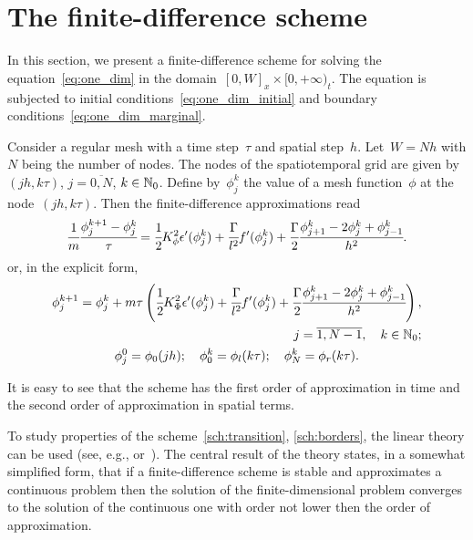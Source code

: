 
\section{The finite-difference scheme}
\label{sec:differential_scheme}

In this section, we present a finite-difference scheme for solving
the equation~\eqref{eq:one_dim} in the domain~$[0, W]_x \times [0,
+\infty)_t$. The equation is
subjected to initial conditions~\eqref{eq:one_dim_initial} and boundary conditions~\eqref{eq:one_dim_marginal}.

Consider a regular mesh with a time step~$\tau$ and
spatial step~$h$. Let~$W = Nh$ with $N$ being the number of
nodes. The nodes of the spatiotemporal grid are given by~$(jh, k \tau)$,
$j = \overline{0, N}$, $k \in {\mathbb{N}}_0$. Define by~$\phi_j^k$
the value of a mesh function~$\phi$ at the node~$(jh, k \tau)$.
Then the finite-difference approximations read
\begin{equation}
  \cfrac{1}{m} \cfrac{{\phi}_j^{k + 1} - {\phi}_j^k}{\tau} = \cfrac{1}{2} K_\phi^2 \epsilon'(\phi_j^k) + \cfrac{\Gamma}{l^2} f'(\phi_j^k) + \cfrac{\Gamma}{2} \cfrac{{\phi}_{j + 1}^k - 2 {\phi}_j^k + {\phi}_{j - 1}^k}{h^2} {\text{.}}
  \label{eq:subtractive}
\end{equation}
or, in the explicit form,
\begin{gather}
  \begin{aligned}
    \phi_j^{k + 1} = \phi_j^k + m \tau \left( \cfrac{1}{2} K_\Phi^2 \epsilon'(\phi_j^k) + \cfrac{\Gamma}{l^2} f'(\phi_j^k) + \cfrac{\Gamma}{2} \cfrac{{\phi}_{j + 1}^k - 2 {\phi}_j^k + {\phi}_{j - 1}^k}{h^2} \right), \\ j = \overline{1, N - 1}, \quad k \in {\mathbb{N}}_0 {\text{;}}
  \end{aligned}
  \label{sch:transition} \\
  \phi_j^0 = \phi_0(jh); \quad \phi_0^k = \phi_l(k \tau); \quad \phi_N^k = \phi_r(k \tau) {\text{.}}
  \label{sch:borders}
\end{gather}

It is easy to see that the scheme has the first order of approximation in
time and the second order of approximation in spatial terms.

To study properties of the scheme~\eqref{sch:transition}, \eqref{sch:borders},
the linear theory can be used (see, e.g.,
\cite[Chapter~10]{bahvalov_computational_methods}
or~\cite[Chapter~IX]{kalitkin_computational_methods}).
The central result of the theory states, in a somewhat simplified
form, that if a finite-difference scheme is stable and approximates a
continuous problem then the solution of the finite-dimensional problem
converges to the solution of the continuous one with order
not lower then the order of approximation.

